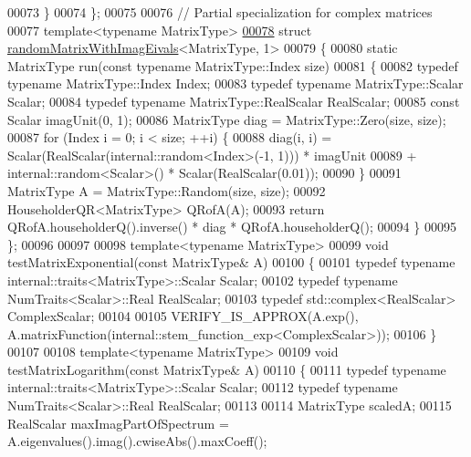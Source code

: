 \begin{DoxyCode}
00073   \}
00074 \};
00075 
00076 \textcolor{comment}{// Partial specialization for complex matrices}
00077 \textcolor{keyword}{template}<\textcolor{keyword}{typename} MatrixType>
\hyperlink{structrandom_matrix_with_imag_eivals_3_01_matrix_type_00_011_01_4}{00078} \textcolor{keyword}{struct }\hyperlink{structrandom_matrix_with_imag_eivals}{randomMatrixWithImagEivals}<MatrixType, 1>
00079 \{
00080   \textcolor{keyword}{static} MatrixType run(\textcolor{keyword}{const} \textcolor{keyword}{typename} MatrixType::Index size)
00081   \{
00082     \textcolor{keyword}{typedef} \textcolor{keyword}{typename} MatrixType::Index Index;
00083     \textcolor{keyword}{typedef} \textcolor{keyword}{typename} MatrixType::Scalar Scalar;
00084     \textcolor{keyword}{typedef} \textcolor{keyword}{typename} MatrixType::RealScalar RealScalar;
00085     \textcolor{keyword}{const} Scalar imagUnit(0, 1);
00086     MatrixType diag = MatrixType::Zero(size, size);
00087     \textcolor{keywordflow}{for} (Index i = 0; i < size; ++i) \{
00088       diag(i, i) = Scalar(RealScalar(internal::random<Index>(-1, 1))) * imagUnit
00089         + internal::random<Scalar>() * Scalar(RealScalar(0.01));
00090     \}
00091     MatrixType A = MatrixType::Random(size, size);
00092     HouseholderQR<MatrixType> QRofA(A);
00093     \textcolor{keywordflow}{return} QRofA.householderQ().inverse() * diag * QRofA.householderQ();
00094   \}
00095 \};
00096 
00097 
00098 \textcolor{keyword}{template}<\textcolor{keyword}{typename} MatrixType>
00099 \textcolor{keywordtype}{void} testMatrixExponential(\textcolor{keyword}{const} MatrixType& A)
00100 \{
00101   \textcolor{keyword}{typedef} \textcolor{keyword}{typename} internal::traits<MatrixType>::Scalar Scalar;
00102   \textcolor{keyword}{typedef} \textcolor{keyword}{typename} NumTraits<Scalar>::Real RealScalar;
00103   \textcolor{keyword}{typedef} std::complex<RealScalar> ComplexScalar;
00104 
00105   VERIFY\_IS\_APPROX(A.exp(), A.matrixFunction(internal::stem\_function\_exp<ComplexScalar>));
00106 \}
00107 
00108 \textcolor{keyword}{template}<\textcolor{keyword}{typename} MatrixType>
00109 \textcolor{keywordtype}{void} testMatrixLogarithm(\textcolor{keyword}{const} MatrixType& A)
00110 \{
00111   \textcolor{keyword}{typedef} \textcolor{keyword}{typename} internal::traits<MatrixType>::Scalar Scalar;
00112   \textcolor{keyword}{typedef} \textcolor{keyword}{typename} NumTraits<Scalar>::Real RealScalar;
00113 
00114   MatrixType scaledA;
00115   RealScalar maxImagPartOfSpectrum = A.eigenvalues().imag().cwiseAbs().maxCoeff();

\end{DoxyCode}
